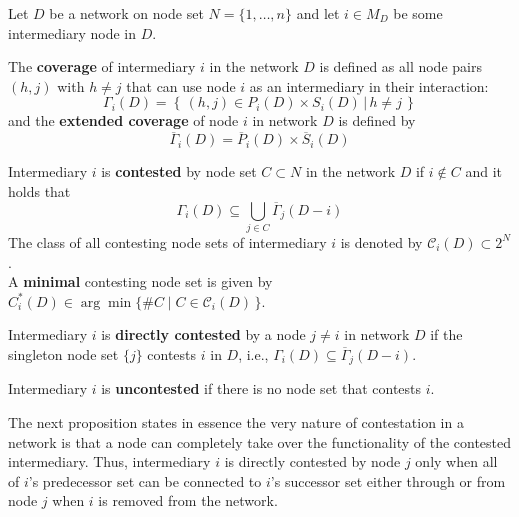 \begin{definition} \label{Contested}
Let $D$ be a network on node set $N=\{1, \ldots ,n\}$ and let $i \in M_D$ be some intermediary node in $D$.
\begin{abet}
\item The \textbf{coverage} of intermediary $i$ in the network $D$ is defined as all node pairs $(h,j)$ with $h \neq j$ that can use node $i$ as an intermediary in their interaction:
\begin{equation}
	\Gamma_i (D) = \left\{ \left. \, (h,j) \in P_i (D) \times S_i (D) \, \right| \, h \neq j \, \right\}
\end{equation}
and the \textbf{extended coverage} of node $i$ in network $D$ is defined by
\begin{equation}
	\overline{\Gamma}_i (D) = \overline{P}_i (D) \times \overline{S}_i (D)
\end{equation}
\item Intermediary $i$ is \textbf{contested} by node set $C \subset N$ in the network $D$ if $i \notin C$ and it holds that
\begin{equation} \label{Group Contested}
\Gamma_i (D) \subseteq \bigcup_{j \in C} \overline{\Gamma}_j (D-i)
\end{equation}
The class of all contesting node sets of intermediary $i$ is denoted by $\mathcal{C}_i (D) \subset 2^N$.
\\
A \textbf{minimal} contesting node set is given by $C_{i}^{*}(D) \in \arg \min \{ \# C \mid C \in \mathcal{C}_{i} (D) \, \}$.

\item Intermediary $i$ is \textbf{directly contested} by a node $j \neq i$ in network $D$ if the singleton node set $\{ j \}$ contests $i$ in $D$, i.e., $\Gamma_i (D) \subseteq \overline{\Gamma}_j (D-i)$.

\item Intermediary $i$ is \textbf{uncontested} if there is no node set that contests $i$.
\end{abet}
\end{definition}

\noindent
The next proposition states in essence the very nature of contestation in a network is that a node can completely take over the functionality of the contested intermediary. Thus, intermediary $i$ is directly contested by node $j$ only when all of $i$'s predecessor set can be connected to $i$'s successor set either through or from node $j$ when $i$ is removed from the network.

